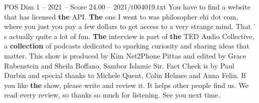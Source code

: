 \begin{textsample}{POS Dim 1 – 2021 – Score 24.00 – 2021/t004019.txt}
You have to find a website that has licensed \textbf{the} API. \textbf{The} one I went to was philosopher ehi dot com, where you just you pay a few dollars to get access to a very strange mind.
That ' s actually quite a lot of fun. \textbf{The} interview is part of \textbf{the} TED Audio Collective, a \textbf{collection} of podcasts dedicated to sparking curiosity and sharing ideas that matter.
This show is produced by Kim Net2Phone Pittas and edited by Grace Rubenstein and Sheila Boffano, Sambor Islamic Sir.
Fact Check is by Paul Durbin and special thanks to Michele Quent, Colin Helmes and Anna Felin.
If you like \textbf{the} show, please write and review it.
It helps other people find us.
We read every review, so thanks so much for listening.
See you next time.

\end{textsample}
